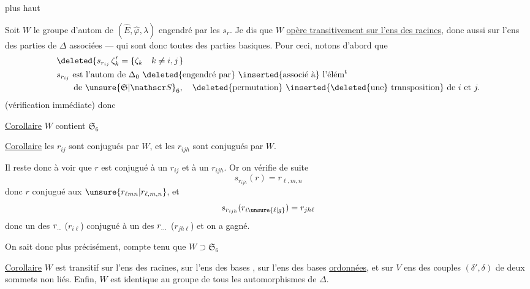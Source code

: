  plus haut



Soit $W$ le groupe d'autom de $(\widehat E,\widehat\varphi,\lambda)$  engendré par les $s_r$. Je dis que $W$ \uline{opère transitivement sur l'ens des racines}, donc aussi sur l'ens des parties  de $\Delta$ associées --- qui sont donc toutes des parties basiques. Pour ceci, notons d'abord que
\[
\begin{aligned}
&\deleted{s_{r_{ij}}\,\zeta'_k=\left\{\zeta_k\quad k\ne i,j\right.}\\
&s_{r_{ij}}\text{ est l'autom de }\Delta_0\ \deleted{\text{engendré par}}\ \inserted{\text{associé à}}\ \text{l'élém}^{\rm t}\\
&\qquad\text{de }\unsure{\mathfrak S|\mathscr S}_6,\quad\deleted{\text{permutation}}\ \inserted{\deleted{\text{une}}\ \text{transposition}}\ \text{de }i\text{ et }j.
\end{aligned}
\]
(vérification immédiate) donc

\uline{Corollaire} $W$ contient $\mathfrak S_6$

\uline{Corollaire} les $r_{ij}$ sont conjugués par $W$, et les $r_{ijh}$ sont conjugués par $W$.

Il reste donc à voir que $r$ est conjugué à un $r_{ij}$ et à un $r_{ijh}$.  Or on vérifie  de suite
\[
s_{r_{ijh}}(r)=r_{\ell,m,n}
\]
donc $r$ conjugué aux $\unsure{r_{\ell mn}|r_{\ell,m,n}}$, et
\[
s_{r_{ijh}}(r_{i\unsure{\ell|g}})=r_{jh\ell}
\]
donc  un des $r_{\ldotp\ldotp}$ ($r_{i\ell}$) conjugué à un des $r_{\ldotp\ldotp\ldotp}$ ($r_{jh\ell}$) et on a gagné.

On sait donc plus précisément, compte tenu que $W\supset\mathfrak S_6$

\uline{Corollaire} $W$ est transitif sur l'ens des  racines, sur l'ens des bases , sur l'ens des bases \uline{ordonnées}, et sur $V$ ens  des couples $(\delta',\delta)$ de deux sommets non liés. Enfin, $W$ est identique au groupe de tous les automorphismes de $\Delta$.
